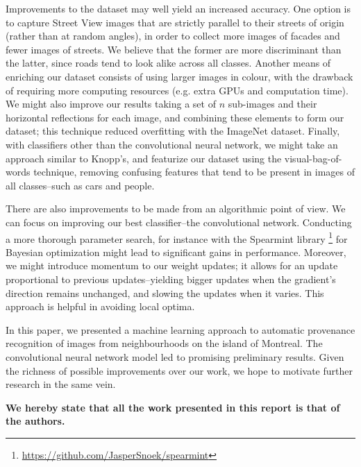 \documentclass{acm_proc_article-sp}
\begin{document}
Improvements to the dataset may well yield an increased accuracy. One option is to capture Street View images that are strictly parallel to their streets of origin (rather than at random angles), in order to collect more images of facades and fewer images of streets. We believe that the former are more discriminant than the latter, since roads tend to look alike across all classes. Another means of enriching our dataset consists of using larger images in colour, with the drawback of requiring more computing resources (e.g. extra GPUs and computation time).  We might also improve our results taking a set of $n$ sub-images and their horizontal reflections for each image, and combining these elements to form our dataset; this technique reduced overfitting with the ImageNet dataset\cite{Krizhevsky}. Finally, with classifiers other than the convolutional neural network, we might take an approach similar to Knopp's\cite{Knopp}, and featurize our dataset using the visual-bag-of-words technique, removing confusing features that tend to be present in images of all classes--such as cars and people.

There are also improvements to be made from an algorithmic point of view. We can focus on improving our best classifier--the convolutional network. Conducting a more thorough parameter search, for instance with the Spearmint library \footnote{\url{https://github.com/JasperSnoek/spearmint}} for Bayesian optimization might lead to significant gains in performance. Moreover, we might introduce momentum to our weight updates; it allows for an update proportional to previous updates--yielding bigger updates when the gradient's direction remains unchanged, and slowing the updates when it varies. This approach is helpful in avoiding local optima\cite{sutskever}. 

In this paper, we presented a machine learning approach to automatic provenance recognition of images from neighbourhoods on the island of Montreal. The convolutional neural network model led to promising preliminary results. Given the richness of possible improvements over our work, we hope to motivate further research in the same vein. 

{\bfseries We hereby state that all the work presented in this report is that of the authors.}




\newpage
\end{document}
